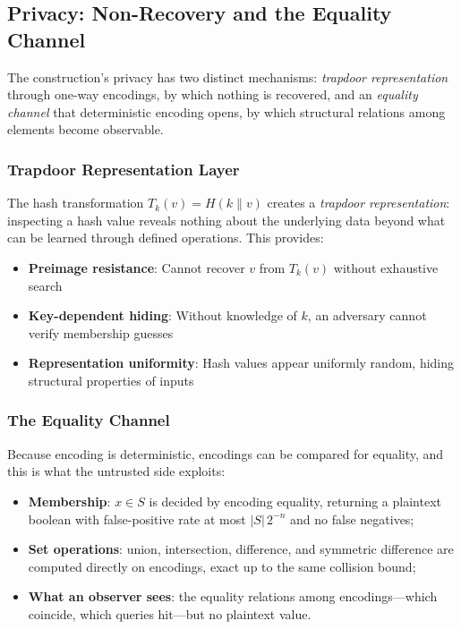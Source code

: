 \documentclass[10pt,conference]{IEEEtran}
\begin{document}
\subsection{Privacy: Non-Recovery and the Equality Channel}
\label{sec:layered-privacy}

The construction's privacy has two distinct mechanisms: \emph{trapdoor representation} through one-way encodings, by which nothing is recovered, and an \emph{equality channel} that deterministic encoding opens, by which structural relations among elements become observable.

\subsubsection{Trapdoor Representation Layer}

The hash transformation $T_k(v) = H(k \| v)$ creates a \emph{trapdoor representation}: inspecting a hash value reveals nothing about the underlying data beyond what can be learned through defined operations. This provides:
\begin{itemize}
\item \textbf{Preimage resistance}: Cannot recover $v$ from $T_k(v)$ without exhaustive search
\item \textbf{Key-dependent hiding}: Without knowledge of $k$, an adversary cannot verify membership guesses
\item \textbf{Representation uniformity}: Hash values appear uniformly random, hiding structural properties of inputs
\end{itemize}

\subsubsection{The Equality Channel}

Because encoding is deterministic, encodings can be compared for equality, and this is what the untrusted side exploits:
\begin{itemize}
\item \textbf{Membership}: $x \in S$ is decided by encoding equality, returning a plaintext boolean with false-positive rate at most $|S|\,2^{-n}$ and no false negatives;
\item \textbf{Set operations}: union, intersection, difference, and symmetric difference are computed directly on encodings, exact up to the same collision bound;
\item \textbf{What an observer sees}: the equality relations among encodings---which coincide, which queries hit---but no plaintext value.
\end{itemize}
\end{document}
